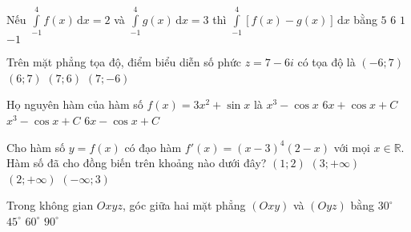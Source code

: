 \begin{ex}%
Nếu $\displaystyle\int\limits_{-1}^4f(x)\mathrm{\,d}x=2$ và $\displaystyle\int\limits_{-1}^4g(x)\mathrm{\,d}x=3$ thì $\displaystyle\int\limits_{-1}^4[f(x)-g(x)]\mathrm{\,d}x$ bằng
\choice
{$5$}
{$6$}
{$1$}
{\True $-1$}
\end{ex}

\begin{ex}%
Trên mặt phẳng tọa độ, điểm biểu diễn số phức $z=7-6i$ có tọa độ là
\choice
{$(-6;7)$}
{$(6;7)$}
{$(7;6)$}
{\True $(7;-6)$}
\end{ex}

\begin{ex}%
Họ nguyên hàm của hàm số $f(x)=3x^2+\sin x$ là
\choice
{$x^3-\cos x$}
{$6x+\cos x+C$}
{\True $x^3-\cos x+C$}
{$6x-\cos x+C$}
\end{ex}

\begin{ex}%
Cho hàm số $y=f(x)$ có đạo hàm $f'(x)=(x-3)^4(2-x)$ với mọi $x\in\mathbb{R}$. Hàm số đã cho đồng biến trên khoảng nào dưới đây?
\choice
{\True $(1;2)$}
{$(3;+\infty)$}
{$(2;+\infty)$}
{$(-\infty ;3)$}
\end{ex}

\begin{ex}%
Trong không gian $Oxyz$, góc giữa hai mặt phẳng $(Oxy)$ và $(Oyz)$ bằng
\choice
{$30^\circ$}
{$45^\circ$}
{$60^\circ$}
{\True $90^\circ$}
\end{ex}

